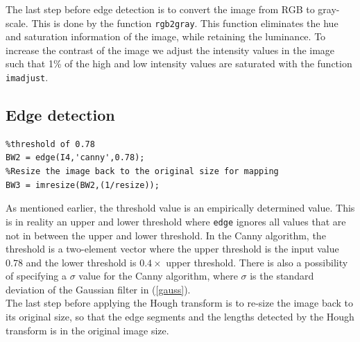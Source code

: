 The last step before edge detection is to convert the image from RGB to gray-scale. This is done by the function \texttt{rgb2gray}. This function eliminates the hue and saturation information of the image, while retaining the luminance. To increase the contrast of the image we adjust the intensity values in the image such that 1\% of the high and low intensity values are saturated with the function \texttt{imadjust}.

\subsection{Edge detection}
\begin{lstlisting}[firstnumber=16]
%Apply the Canny edge detection algorithm with the tuned
%threshold of 0.78
BW2 = edge(I4,'canny',0.78);
%Resize the image back to the original size for mapping
BW3 = imresize(BW2,(1/resize));
\end{lstlisting}
As mentioned earlier, the threshold value is an empirically determined value. This is in reality an upper and lower threshold where \texttt{edge} ignores all values that are not in between the upper and lower threshold. In the Canny algorithm, the threshold is a two-element vector where the upper threshold is the input value $0.78$ and the lower threshold is $0.4 \times$ upper threshold. There is also a possibility of specifying a $\sigma$ value for the Canny algorithm, where $\sigma$ is the standard deviation of the Gaussian filter in (\ref{gauss}).\\

The last step before applying the Hough transform is to re-size the image back to its original size, so that the edge segments and the lengths detected by the Hough transform is in the original image size.

